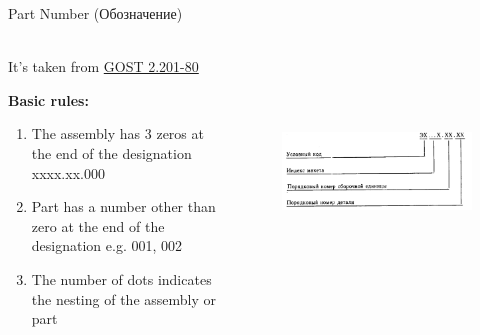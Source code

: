 \documentclass[aspectratio=169]{beamer}
\begin{document}
\begin{frame}[t]{Part Number (Обозначение)}
    \framesubtitle{}


    \begin{columns}[T,onlytextwidth]
        \begin{column}{0.49\textwidth}
            It's taken from \href{http://www.robot.bmstu.ru/files/GOST/gost_2.201-80.pdf}{GOST 2.201-80}

            \textbf{Basic rules:}
            \begin{enumerate}
                \item The assembly has 3 zeros at the end of the designation xxxx.xx.000
                \item Part has a number other than zero at the end of the designation e.g. 001, 002
                \item The number of dots indicates the nesting of the assembly or part
            \end{enumerate}
        \end{column}
        \begin{column}{0.49\textwidth}
            \begin{figure}[H]
                \centering\includegraphics[height=6cm,width=1\textwidth,keepaspectratio]{name_2.png}
                \label{fig:name_2.png}
            \end{figure}
        \end{column}
    \end{columns}
\end{frame}
\end{document}

